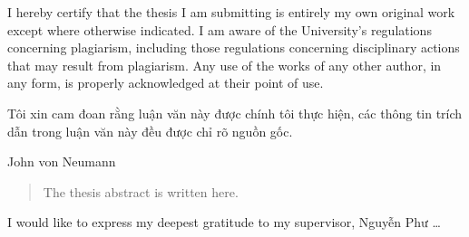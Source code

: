 \documentclass[12pt, %
twoside, %
singlespacing, %
headsepline, %
]{ThesisHCMUE}
\begin{document}

\begin{declaration}
\addchaptertocentry{\authorshipname} %
I hereby certify that the thesis I am submitting is entirely my own original work except where otherwise indicated. I am aware of the University's regulations concerning plagiarism, including those regulations concerning disciplinary actions that may result from plagiarism. Any use of the works of any other author, in any form, is properly acknowledged at their point of use.

Tôi xin cam đoan rằng luận văn này được chính tôi thực hiện, các thông tin trích dẫn trong luận văn này đều được chỉ rõ nguồn gốc.
\end{declaration}
\cleardoublepage


\vspace*{0.2\textheight}

\bigbreak

\hfill John von Neumann


\begin{abstract}
\addchaptertocentry{\abstractname} 
\thispagestyle{empty}  %
The thesis abstract is written here.
\end{abstract}


\begin{acknowledgements}
\addchaptertocentry{\acknowledgementname} %
I would like to express my deepest gratitude to my supervisor, Nguyễn Phư \ldots
\end{acknowledgements}
\end{document}
